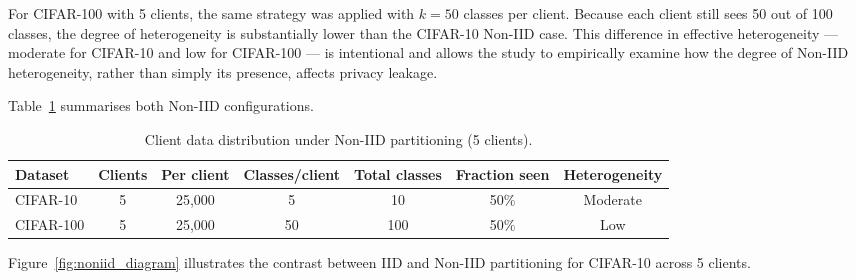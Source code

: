 \documentclass[12pt, a4paper]{report}
\begin{document}
For CIFAR-100 with 5 clients, the same strategy was applied with $k = 50$ classes
per client. Because each client still sees 50 out of 100 classes, the degree of
heterogeneity is substantially lower than the CIFAR-10 Non-IID case. This
difference in effective heterogeneity --- moderate for CIFAR-10 and low for
CIFAR-100 --- is intentional and allows the study to empirically examine how
the degree of Non-IID heterogeneity, rather than simply its presence, affects
privacy leakage.

Table~\ref{tab:noniid_distribution} summarises both Non-IID configurations.

\begin{table}[H]
  \centering
  \caption{Client data distribution under Non-IID partitioning (5 clients).}
  \label{tab:noniid_distribution}
  \begin{tabular}{lcccccc}
    \toprule
    \textbf{Dataset} & \textbf{Clients} & \textbf{Per client} & \textbf{Classes/client} & \textbf{Total classes} & \textbf{Fraction seen} & \textbf{Heterogeneity} \\
    \midrule
    CIFAR-10  & 5 & 25,000 & 5  & 10  & 50\% & Moderate \\
    CIFAR-100 & 5 & 25,000 & 50 & 100 & 50\% & Low \\
    \bottomrule
  \end{tabular}
\end{table}

\noindent Figure~\ref{fig:noniid_diagram} illustrates the contrast between IID
and Non-IID partitioning for CIFAR-10 across 5 clients.
\end{document}
